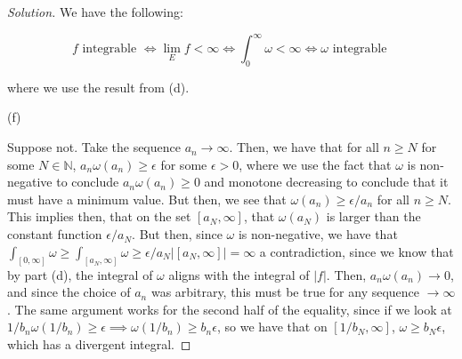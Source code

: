 \documentclass[10pt]{article}
\begin{document}
\begin{proof}[Solution]
We have the following:

$$ f \text{ integrable } \iff \lim_{E} f < \infty \iff \int_0^\infty \omega < \infty \iff \omega \text{ integrable } $$

where we use the result from (d).

(f)

Suppose not. Take the sequence $a_n \to \infty$. Then, we have that for all $n \geq N$ for some $N \in \mathbb{N}$, $a_n \omega(a_n) \geq \epsilon$ for some $\epsilon > 0$, where we use the fact that $\omega$ is non-negative to conclude $a_n \omega(a_n) \geq 0$ and monotone decreasing to conclude that it must have a minimum value. But then, we see that $\omega(a_n) \geq \epsilon/a_n$ for all $n \geq N$. This implies then, that on the set $[a_N,\infty]$, that $\omega(a_N)$ is larger than the constant function $\epsilon/a_N$. But then, since $\omega$ is non-negative, we have that $\int_{[0,\infty]} \omega \geq \int_{[a_N, \infty]} \omega \geq \epsilon/a_N |[a_N,\infty]| = \infty$ a contradiction, since we know that by part (d), the integral of $\omega$ aligns with the integral of $|f|$. Then, $a_n \omega(a_n) \to 0$, and since the choice of $a_n$ was arbitrary, this must be true for any sequence $\to \infty$. The same argument works for the second half of the equality, since if we look at $1/b_n \omega(1/b_n) \geq \epsilon \implies \omega(1/b_n) \geq b_n \epsilon$, so we have that on $[1/b_N, \infty]$, $\omega \geq b_N \epsilon$, which has a divergent integral.

\end{proof}
\end{document}
